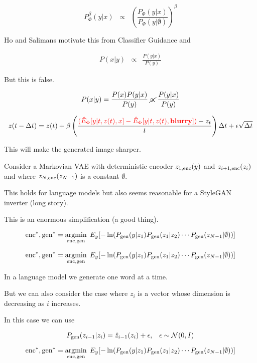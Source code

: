 {$$P^\beta_\Phi(y|x) \;\;\propto \;\;  \left(\frac{P_\Phi(y|x)}{P_\Phi(y|\emptyset)}\right)^\beta$$

\vfill
Ho and Salimans motivate this from Classifier Guidance and

\vfill
{\huge \begin{eqnarray*}
P(x|y) & \propto & \frac{P(y|x)}{P(y)}
\end{eqnarray*}}

\vfill
But this is false.

\vfill
{\huge $$P(x|y) = \frac{P(x)P(y|x)}{P(y)} \;\cancel{\propto}\;\frac{P(y|x)}{P(y)}$$}


{\huge $$z(t - \Delta t) = z(t) + \beta\left(\frac{{\color{red} (\hat{E}_\Phi[y|t,z(t),x] - \hat{E}_\Phi[y|t,z(t),\bf{blurry}])} - z_t}{t}\right)\Delta t + \epsilon\sqrt{\Delta t}$$}

\vfill
This will make the generated image sharper.


Consider a Markovian VAE with deterministic encoder $z_{1,\mathrm{enc}}(y)$ and $z_{i+1,\mathrm{enc}}(z_i)$ and where $z_{N,\mathrm{enc}}(z_{N-1})$ is a constant $\emptyset$.

\vfill
This holds for language models but also seems reasonable for a StyleGAN inverter (long story).

\vfill
This is an enormous simplification (a good thing).

{\huge
$$\mathrm{enc}^*,\mathrm{gen}^* = \operatorname*{argmin}_{\mathrm{enc},\mathrm{gen}} \;E_y[- \ln (P_{\mathrm{gen}}(y|z_1)P_{\mathrm{gen}}(z_1|z_2)\cdots P_{\mathrm{gen}}(z_{N-1}|\emptyset))]$$
}


{\huge
$$\mathrm{enc}^*,\mathrm{gen}^* = \operatorname*{argmin}_{\mathrm{enc},\mathrm{gen}} \;E_y[- \ln (P_{\mathrm{gen}}(y|z_1)P_{\mathrm{gen}}(z_1|z_2)\cdots P_{\mathrm{gen}}(z_{N-1}|\emptyset))]$$
}

\vfill
In a language model we generate one word at a time.

\vfill
But we can also consider the case where $z_i$ is a vector whose dimension is decreasing as $i$ increases.

\vfill
In this case we can use

$$P_{\mathrm{gen}}(z_{i-1}|z_i) = \hat{z}_{i-1}(z_i) + \epsilon,\;\;\;\epsilon\sim {\cal N}(0,I)$$


{\huge
$$\mathrm{enc}^*,\mathrm{gen}^* = \operatorname*{argmin}_{\mathrm{enc},\mathrm{gen}} \;E_y[- \ln (P_{\mathrm{gen}}(y|z_1)P_{\mathrm{gen}}(z_1|z_2)\cdots P_{\mathrm{gen}}(z_{N-1}|\emptyset))]$$
}

}
